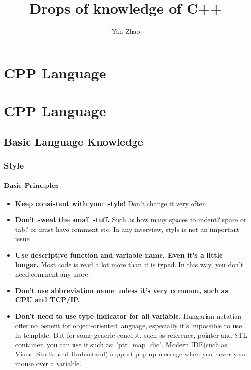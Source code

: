 \documentclass[a4paper,12pt,twoside]{book}
\begin{document}
\title{Drops of knowledge of C++}
\author{Yan Zhao}
\date{}\maketitle

\setcounter{secnumdepth}{4}
\setcounter{tocdepth}{4}
\tableofcontents
\chapter{CPP Language}

\else
\chapter{CPP Language}
\fi


\section{Basic Language Knowledge}
\subsection{Style}
\subsubsection{Basic Principles}
\begin{itemize}
\item \textbf{Keep consistent with your style!} Don't change it very often. 

\item \textbf{Don't sweat the small stuff.} Such as how many spaces to indent? space or tab? or must have comment etc. In any interview, style is not an important issue. 

\item \textbf{Use descriptive function and variable name. Even it's a little longer.} Most code is read a lot more than it is typed. In this way, you don't need comment any more. 

\item \textbf{Don't use abbreviation name unless it's very common, such as CPU and TCP/IP.}

\item \textbf{Don't need to use type indicator for all variable.} Hungarian notation offer no benefit for object-oriented language, especially it's impossible to use in template. But for some generic concept, such as reference, pointer and STL container, you can use it such as: "ptr\_map\_dic". Modern IDE(such as Visual Studio and Understand) support pop up message when you hover your mouse over a variable.
\end{itemize}
\end{document}
